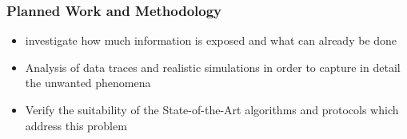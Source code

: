 \subsubsection{Planned Work and Methodology}

\begin{itemize}
	\item investigate how much information is exposed and what can already be done
	\item Analysis of data traces and realistic simulations in order to capture in detail the unwanted phenomena
	\item Verify the suitability of the State-of-the-Art algorithms and protocols which address this problem
\end{itemize}
